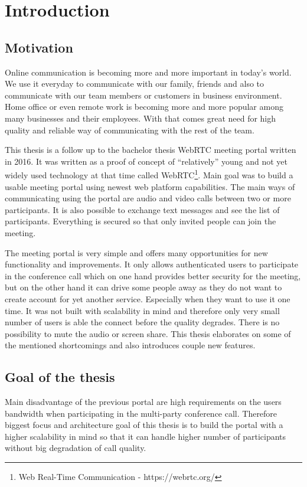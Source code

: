 \documentclass[
  digital, %
  table,   %
  lof,     %
  nolot,     %
]{fithesis3}
\begin{document}
\chapter{Introduction}
\section{Motivation}
Online communication is becoming more and more important in today’s world. We use it everyday to communicate with our family, friends and also to communicate with our team members or customers in business environment. Home office or even remote work is becoming more and more popular among many businesses and their employees. With that comes great need for high quality and reliable way of communicating with the rest of the team.

This thesis is a follow up to the bachelor thesis WebRTC meeting portal  \cite{bachelorThesis} written in 2016. It was written as a proof of concept of “relatively” young and not yet widely used technology at that time called WebRTC\footnote{Web Real-Time Communication - https://webrtc.org/
}. Main goal was to build a usable meeting portal using newest web platform capabilities. The main ways of communicating using the portal are audio and video calls between two or more participants. It is also possible to exchange text messages and see the list of participants. Everything is secured so that only invited people can join the meeting.

The meeting portal is very simple and offers many opportunities for new functionality and improvements. It only allows authenticated users to participate in the conference call which on one hand provides better security for the meeting, but on the other hand it can drive some people away as they do not want to create account for yet another service. Especially when they want to use it one time. It was not built with scalability in mind and therefore only very small number of users is able the connect before the quality degrades. There is no possibility to mute the audio or screen share. This thesis elaborates on some of the mentioned shortcomings and also introduces couple new features.

\section{Goal of the thesis}
Main disadvantage of the previous portal are high requirements on the users bandwidth when participating in the multi-party conference call. Therefore biggest focus and architecture goal of this thesis is to build the portal with a higher scalability in mind so that it can handle higher number of participants without big degradation of call quality.
\end{document}
